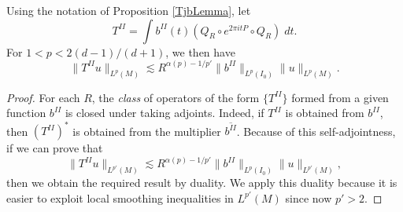 \begin{lemma} \label{LocalSmoothingLargeTimesTheorem}
    Using the notation of Proposition \ref{TjbLemma}, let
    \[ T^{II} = \int b^{II}(t) (Q_R \circ e^{2 \pi i t P} \circ Q_R)\; dt. \]
    For $1 < p < 2 (d-1)/(d+1)$, we then have
    \[ \| T^{II} u \|_{L^p(M)} \lesssim R^{\alpha(p) - 1/p'} \| b^{II} \|_{L^p(I_0)} \| u \|_{L^p(M)}. \]
\end{lemma}
\begin{proof}
    For each $R$, the \emph{class} of operators of the form $\{ T^{II} \}$ formed from a given function $b^{II}$ is closed under taking adjoints. Indeed, if $T^{II}$ is obtained from $b^{II}$, then $(T^{II})^*$ is obtained from the multiplier $\overline{b^{II}}$. Because of this self-adjointness, if we can prove that
    \begin{equation}
        \| T^{II} u \|_{L^{p'}(M)} \lesssim R^{\alpha(p) - 1/p'} \| b^{II} \|_{L^p(I_0)} \| u \|_{L^{p'}(M)},
    \end{equation}
    then we obtain the required result by duality. We apply this duality because it is easier to exploit local smoothing inequalities in $L^{p'}(M)$ since now $p' > 2$.


\end{proof}

